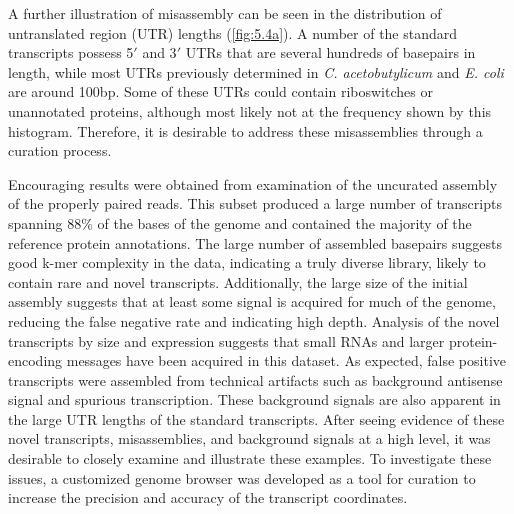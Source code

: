 A further illustration of misassembly can be seen in the distribution of untranslated region (UTR) lengths (\ref{fig:5.4a}). A number of the standard transcripts possess 5$\prime$ and 3$\prime$ UTRs that are several hundreds of basepairs in length, while most UTRs previously determined in \textit{C. acetobutylicum}\cite{63,64,69,74,76} and \textit{E. coli}\cite{87} are around 100bp. Some of these UTRs could contain riboswitches or unannotated proteins, although most likely not at the frequency shown by this histogram. Therefore, it is desirable to address these misassemblies through a curation process.

Encouraging results were obtained from examination of the uncurated assembly of the properly paired reads. This subset produced a large number of transcripts spanning 88\% of the bases of the genome and contained the majority of the reference protein annotations. The large number of assembled basepairs suggests good k-mer complexity in the data, indicating a truly diverse library, likely to contain rare and novel transcripts. Additionally, the large size of the initial assembly suggests that at least some signal is acquired for much of the genome, reducing the false negative rate and indicating high depth. Analysis of the novel transcripts by size and expression suggests that small RNAs and larger protein-encoding messages have been acquired in this dataset. As expected, false positive transcripts were assembled from technical artifacts such as background antisense signal and spurious transcription. These background signals are also apparent in the large UTR lengths of the standard transcripts. After seeing evidence of these novel transcripts, misassemblies, and background signals at a high level, it was desirable to closely examine and illustrate these examples. To investigate these issues, a customized genome browser was developed as a tool for curation to increase the precision and accuracy of the transcript coordinates.









